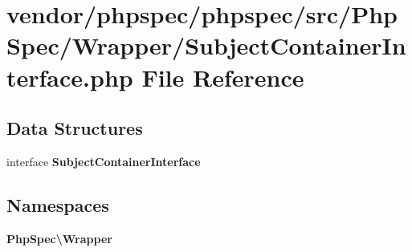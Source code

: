 \section{vendor/phpspec/phpspec/src/\+Php\+Spec/\+Wrapper/\+Subject\+Container\+Interface.php File Reference}
\label{_subject_container_interface_8php}
\subsection*{Data Structures}
\begin{DoxyCompactItemize}
\item 
interface {\bf Subject\+Container\+Interface}
\end{DoxyCompactItemize}
\subsection*{Namespaces}
\begin{DoxyCompactItemize}
\item 
 {\bf Php\+Spec\textbackslash{}\+Wrapper}
\end{DoxyCompactItemize}
